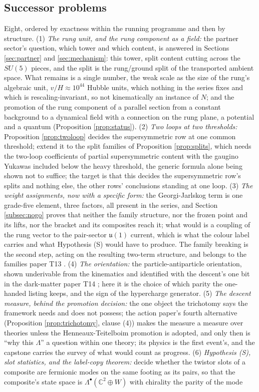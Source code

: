 \documentclass[11pt]{article}
\theoremstyle{definition}
\newcommand{\C}{\mathbb{C}}
\newcommand{\uu}{\mathfrak{u}}
\begin{document}
\subsection*{Successor problems}

Eight, ordered by exactness within the running programme and then by structure. (1) \emph{The rung unit, and the rung component as a field:} the partner sector's question, which tower and which content, is answered in Sections \ref{sec:partner} and \ref{sec:mechanism}: this tower, split content cutting across the $SU(5)$ pieces, and the split is the rung/ground split of the transported ambient space. What remains is a single number, the weak scale as the size of the rung's algebraic unit, $v/H \approx 10^{44}$ Hubble units, which nothing in the series fixes and which is rescaling-invariant, so not kinematically an instance of $N$; and the promotion of the rung component of a parallel section from a constant background to a dynamical field with a connection on the rung plane, a potential and a quantum (Proposition \ref{prop:status}). (2) \emph{Two loops at two thresholds:} Proposition \ref{prop:twoloop} decides the supersymmetric row at one common threshold; extend it to the split families of Proposition \ref{prop:splits}, which needs the two-loop coefficients of partial supersymmetric content with the gaugino Yukawas included below the heavy threshold, the generic formula alone being shown not to suffice; the target is that this decides the supersymmetric row's splits and nothing else, the other rows' conclusions standing at one loop. (3) \emph{The weight assignments, now with a specific form:} the Georgi-Jarlskog term is one grade-five element, three factors, all present in the series, and Section \ref{subsec:nogo} proves that neither the family structure, nor the frozen point and its lifts, nor the bracket and its composites reach it; what would is a coupling of the rung vector to the pair-sector $\uu(1)$ current, which is what the colour label carries and what Hypothesis (S) would have to produce. The family breaking is the second step, acting on the resulting two-term structure, and belongs to the families paper T13 \cite{ButlerT13}. (4) \emph{The orientation:} the particle-antiparticle orientation, shown underivable from the kinematics and identified with the descent's one bit in the dark-matter paper T14 \cite[Prop.~5.2]{ButlerT14}; here it is the choice of which parity the one-handed listing keeps, and the sign of the hypercharge generator. (5) \emph{The descent measure, behind the promotion decision:} the one object the trichotomy says the framework needs and does not possess; the action paper's fourth alternative (Proposition \ref{prop:trichotomy}, clause (4)) makes the measure a measure over theories unless the Henneaux-Teitelboim promotion is adopted, and only then is ``why this $\Lambda$'' a question within one theory; its physics is the first event's, and the capstone carries the survey of what would count as progress. (6) \emph{Hypothesis (S), slot statistics, and the label-copy theorem:} decide whether the twistor slots of a composite are fermionic modes on the same footing as its pairs, so that the composite's state space is $\Lambda^{\bullet}(\C^{2} \oplus W)$ with chirality the parity of the mode 
\end{document}

